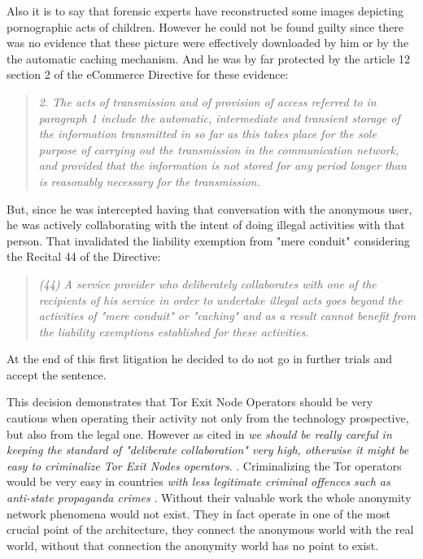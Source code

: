 \documentclass[runningheads,a4paper]{llncs}
\begin{document}
Also it is to say that forensic experts have reconstructed some images depicting pornographic acts of children. However he could not be found guilty since there was no evidence that these picture were effectively downloaded by him or by the the automatic caching mechanism. And he was by far protected by the article 12 section 2 of the eCommerce Directive for these evidence:

\begin{quote}
    \textit{2. The acts of transmission and of provision of access referred to in paragraph 1 include the automatic, intermediate and transient storage of the information transmitted in so far as this takes place for the sole purpose of carrying out the transmission in the communication network, and provided that the information is not stored for any period longer than is reasonably necessary for the transmission.}
\end{quote}

But, since he was intercepted having that conversation with the anonymous user, he was actively collaborating with the intent of doing illegal activities with that person. That invalidated the liability exemption from "mere conduit" considering the Recital 44 of the Directive:

\begin{quote}
    \textit{
(44) A service provider who deliberately collaborates with one of the recipients of his service in order to undertake illegal acts goes beyond the activities of "mere conduit" or "caching" and as a result cannot benefit from the liability exemptions established for these activities.}
\end{quote}

At the end of this first litigation he decided to do not go in further trials and accept the sentence.

This decision demonstrates that Tor Exit Node Operators should be very cautious when operating their activity not only from the technology prospective, but also from the legal one. However as cited in \cite{HUSOVEC} \textit{we should be really careful in keeping the standard of "deliberate collaboration" very high, otherwise it might be easy to criminalize Tor Exit Nodes operators}. . Criminalizing the Tor operators would be very easy in countries \textit{with less legitimate criminal offences such as anti-state propaganda crimes} \cite{HUSOVEC}. Without their valuable work the whole anonymity network phenomena would not exist. They in fact operate in one of the most crucial point of the architecture, they connect the anonymous world with the real world, without that connection the anonymity world has no point to exist.
\end{document}
